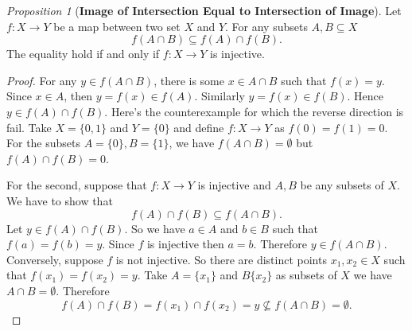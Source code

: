 \documentclass[a4paper]{article}
\theoremstyle{remark}
\newtheorem{prop}{Proposition}
\newcommand{\subhim}{\subseteq} %
\begin{document}
\begin{prop}[\textbf{Image of Intersection Equal to Intersection of Image}]
Let $f : X \to Y$ be a map between two set $X$ and $Y$. For any subsets $A,B \subhim X$
$$
f(A \cap B) \subhim f(A) \cap f(B). 
$$
The equality hold if and only if $f : X \to Y$ is injective.
\end{prop}
\begin{proof}
For any $y \in f(A\cap B)$, there is some $x \in A \cap B$ such that $f(x) = y$. Since $x \in A$, then $y = f(x) \in f(A)$. Similarly $y=f(x) \in f(B)$. Hence $y \in f(A) \cap f(B)$. Here's the counterexample for which the reverse direction is fail. Take $X = \{0,1\}$ and $Y= \{0\}$ and define $f : X \to Y$ as $f(0) = f(1) = 0$. For the subsets $A=\{0\}, B = \{1\}$, we have $f(A\cap B) = \emptyset$ but $f(A)\cap f(B) = 0$. 

For the second, suppose that $f : X \to Y$ is injective and $A,B$ be any subsets of $X$. We have to show that 
$$
f(A) \cap f(B) \subhim f(A\cap B).
$$
Let $y \in f(A)\cap f(B)$. So we have $a \in A$ and $b \in B$ such that $f(a) = f(b) = y$. Since $f$ is injective then $a=b$. Therefore $y \in f(A\cap B) $. Conversely, suppose $f$ is not injective. So there are distinct points $x_1,x_2 \in X$ such that $f(x_1) = f(x_2) = y$. Take $A=\{x_1\}$ and $B\{x_2\}$ as subsets of $X$ we have $A\cap B  = \emptyset$. Therefore  
$$
f(A)\cap f(B) = f(x_1) \cap f(x_2) = y \nsubseteq f(A\cap B) = \emptyset.
$$
\end{proof}
\end{document}
